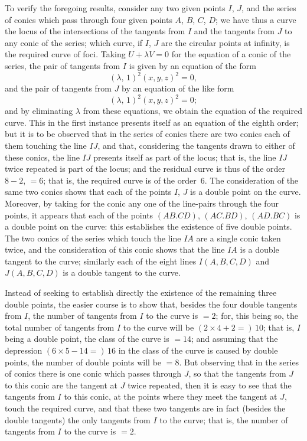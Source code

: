 \documentclass[11pt,a4paper]{article}
\begin{document}
To verify the foregoing results, consider any two given points $I$, $J$, and the
series of conics which pass through four given points $A$, $B$, $C$, $D$; we have
thus a curve the locus of the intersections of the tangents from $I$ and the
tangents from $J$ to any conic of the series; which curve, if $I$, $J$ are the
circular points at infinity, is the required curve of foci.  Taking
$U + \lambda V = 0$ for the equation of a conic of the series, the pair of
tangents from $I$ is given by an equation of the form
\[
(\lambda,\, 1)^2(x,y,z)^2 = 0,
\]
and the pair of tangents from $J$ by an equation of the like form
\[
(\lambda,\, 1)^2(x,y,z)^2 = 0;
\]
and by eliminating $\lambda$ from these equations, we obtain the equation of the
required curve.  This in the first instance presents itself as an equation of
the eighth order; but it is to be observed that in the series of conics there
are two conics each of them touching the line $IJ$, and that, considering the
tangents drawn to either of these conics, the line $IJ$ presents itself as part
of the locus; that is, the line $IJ$ twice repeated is part of the locus; and
the residual curve is thus of the order $8-2$, $=6$; that is, the required
curve is of the order~6.  The consideration of the same two conics shows that
each of the points $I$, $J$ is a double point on the curve.  Moreover, by
taking for the conic any one of the line-pairs through the four points, it
appears that each of the points $(AB.CD)$, $(AC.BD)$, $(AD.BC)$ is a double
point on the curve: this establishes the existence of five double points.  The
two conics of the series which touch the line $IA$ are a single conic taken
twice, and the consideration of this conic shows that the line $IA$ is a
double tangent to the curve; similarly each of the eight lines $I(A,B,C,D)$
and $J(A,B,C,D)$ is a double tangent to the curve.

Instead of seeking to establish directly the existence of the remaining three
double points, the easier course is to show that, besides the four double
tangents from $I$, the number of tangents from $I$ to the curve is $=2$; for,
this being so, the total number of tangents from $I$ to the curve will be
$(2\times 4+2=)\,10$; that is, $I$ being a double point, the class of the
curve is $=14$; and assuming that the depression $(6\times5-14=)\,16$ in the
class of the curve is caused by double points, the number of double points
will be $=8$.  But observing that in the series of conics there is one conic
which passes through $J$, so that the tangents from $J$ to this conic are the
tangent at $J$ twice repeated, then it is easy to see that the tangents from
$I$ to this conic, at the points where they meet the tangent at $J$, touch the
required curve, and that these two tangents are in fact (besides the double
tangents) the only tangents from $I$ to the curve; that is, the number of
tangents from $I$ to the curve is $=2$.
\end{document}
